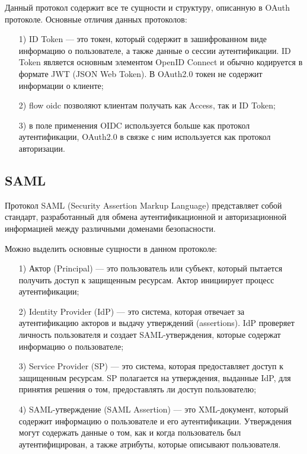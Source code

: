 Данный протокол содержит все те сущности и структуру, описанную в OAuth протоколе.
Основные отличия данных протоколов:
 \begin{enumerate}
  \item[1)] ID Token --- это токен, который содержит в зашифрованном виде информацию о пользователе, а также данные о сессии аутентификации. ID Token является основным элементом OpenID Connect и обычно кодируется в формате JWT (JSON Web Token). В OAuth2.0 токен не содержит информации о клиенте;
  \item[2)] flow oidc позволяют клиентам получать как Access, так и ID Token;
  \item[3)] в поле применения OIDC используется больше как протокол аутентификации, OAuth2.0 в связке с ним используется как протокол авторизации.
\end{enumerate}

\pagebreak

\subsection{SAML}
Протокол SAML (Security Assertion Markup Language) представляет собой стандарт, разработанный для обмена аутентификационной и авторизационной информацией между различными доменами безопасности.

Можно выделить основные сущности в данном протоколе:
 \begin{enumerate}
  \item[1)] Актор (Principal) --- это пользователь или субъект, который пытается получить доступ к защищенным ресурсам. Актор инициирует процесс аутентификации;
  \item[2)] Identity Provider (IdP) --- это система, которая отвечает за аутентификацию акторов и выдачу утверждений (assertions). IdP проверяет личность пользователя и создает SAML-утверждения, которые содержат информацию о пользователе;
  \item[3)] Service Provider (SP) --- это система, которая предоставляет доступ к защищенным ресурсам. SP полагается на утверждения, выданные IdP, для принятия решения о том, предоставлять ли доступ пользователю;
  \item[4)] SAML-утверждение (SAML Assertion) --- это XML-документ, который содержит информацию о пользователе и его аутентификации. Утверждения могут содержать данные о том, как и когда пользователь был аутентифицирован, а также атрибуты, которые описывают пользователя.
\end{enumerate}

